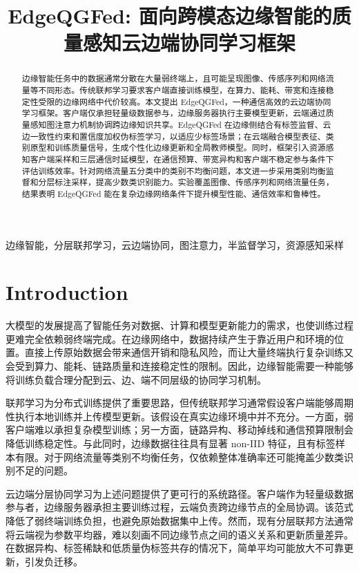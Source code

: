 \documentclass[journal]{IEEEtran}
\begin{document}
\title{EdgeQGFed: 面向跨模态边缘智能的质量感知云边端协同学习框架}

\maketitle

\begin{abstract}
边缘智能任务中的数据通常分散在大量弱终端上，且可能呈现图像、传感序列和网络流量等不同形态。传统联邦学习要求客户端直接训练模型，在算力、能耗、带宽和连接稳定性受限的边缘网络中代价较高。本文提出 EdgeQGFed，一种通信高效的云边端协同学习框架。客户端仅承担轻量级数据参与，边缘服务器执行主要模型更新，云端通过质量感知图注意力机制协调跨边缘知识共享。EdgeQGFed 在边缘侧结合有标签监督、云边一致性约束和置信度加权伪标签学习，以适应少标签场景；在云端融合模型表征、类别原型和训练质量信号，生成个性化边缘更新和全局教师模型。同时，框架引入资源感知客户端采样和三层通信时延模型，在通信预算、带宽异构和客户端不稳定参与条件下评估训练效率。针对网络流量五分类中的类别不均衡问题，本文进一步采用类别均衡监督和分层标注采样，提高少数类识别能力。实验覆盖图像、传感序列和网络流量任务，结果表明 EdgeQGFed 能在复杂边缘网络条件下提升模型性能、通信效率和鲁棒性。
\end{abstract}

\begin{IEEEkeywords}
边缘智能，分层联邦学习，云边端协同，图注意力，半监督学习，资源感知采样
\end{IEEEkeywords}

\section{Introduction}

大模型的发展提高了智能任务对数据、计算和模型更新能力的需求，也使训练过程更难完全依赖弱终端完成。在边缘网络中，数据持续产生于靠近用户和环境的位置。直接上传原始数据会带来通信开销和隐私风险，而让大量终端执行复杂训练又会受到算力、能耗、链路质量和连接稳定性的限制。因此，边缘智能需要一种能够将训练负载合理分配到云、边、端不同层级的协同学习机制。

联邦学习为分布式训练提供了重要思路，但传统联邦学习通常假设客户端能够周期性执行本地训练并上传模型更新。该假设在真实边缘环境中并不充分。一方面，弱客户端难以承担复杂模型训练；另一方面，链路异构、移动掉线和通信预算限制会降低训练稳定性。与此同时，边缘数据往往具有显著 non-IID 特征，且有标签样本有限。对于网络流量等类别不均衡任务，仅依赖整体准确率还可能掩盖少数类识别不足的问题。

云边端分层协同学习为上述问题提供了更可行的系统路径。客户端作为轻量级数据参与者，边缘服务器承担主要训练过程，云端负责跨边缘节点的全局协调。该范式降低了弱终端训练负担，也避免原始数据集中上传。然而，现有分层联邦方法通常将云端视为参数平均器，难以刻画不同边缘节点之间的语义关系和更新质量差异。在数据异构、标签稀缺和低质量伪标签共存的情况下，简单平均可能放大不可靠更新，引发负迁移。
\end{document}

